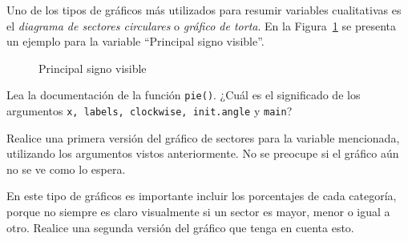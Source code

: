 \documentclass{../prob}
\begin{document}
	\begin{problema}
	Uno de los tipos de gráficos más utilizados para resumir variables cualitativas es el \textit{diagrama de sectores circulares} o \textit{gráfico de torta}. En la Figura~\ref{fig:plot01} se presenta un ejemplo para la variable \textquotedblleft Principal signo visible\textquotedblright.\\

\begin{figure}[!ht]
    \centering
    
    \caption{Principal signo visible}
    \label{fig:plot01}
\end{figure}

	\begin{parte}
		Lea la documentación de la función \texttt{pie()}. ¿Cuál es el significado de los argumentos \texttt{x, labels, clockwise, init.angle} y \texttt{main}?
	\end{parte}

	\begin{parte}
		Realice una primera versión del gráfico de sectores para la variable mencionada, utilizando los argumentos vistos anteriormente. No se preocupe si el gráfico aún no se ve como lo espera.
	\end{parte}	
	
	\begin{parte}	
	En este tipo de gráficos es importante incluir los porcentajes de cada categoría, porque no siempre es claro visualmente si un sector es mayor, menor o igual a otro. Realice una segunda versión del gráfico que tenga en cuenta esto.\\		
		
		\noindent{}	
	\end{parte}	
	

\end{problema}
\end{document}
